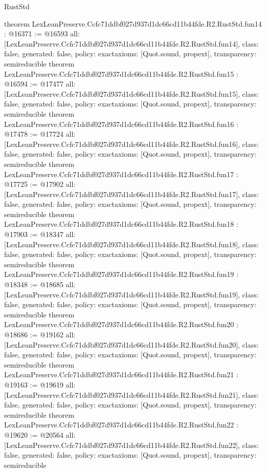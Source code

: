 \begin{lexlean}{RustStd}
\begin{coremodule}
{}
theorem LexLeanPreserve.Ccfc71ddbf027d937d1dc66cd11b44fde.R2.RustStd.fun14 : @16371 := @16593 {
  all: [LexLeanPreserve.Ccfc71ddbf027d937d1dc66cd11b44fde.R2.RustStd.fun14],
  class: false,
  generated: false,
  policy: exact{axioms: [Quot.sound, propext]},
  transparency: semireducible
}
theorem LexLeanPreserve.Ccfc71ddbf027d937d1dc66cd11b44fde.R2.RustStd.fun15 : @16594 := @17477 {
  all: [LexLeanPreserve.Ccfc71ddbf027d937d1dc66cd11b44fde.R2.RustStd.fun15],
  class: false,
  generated: false,
  policy: exact{axioms: [Quot.sound, propext]},
  transparency: semireducible
}
theorem LexLeanPreserve.Ccfc71ddbf027d937d1dc66cd11b44fde.R2.RustStd.fun16 : @17478 := @17724 {
  all: [LexLeanPreserve.Ccfc71ddbf027d937d1dc66cd11b44fde.R2.RustStd.fun16],
  class: false,
  generated: false,
  policy: exact{axioms: [Quot.sound, propext]},
  transparency: semireducible
}
theorem LexLeanPreserve.Ccfc71ddbf027d937d1dc66cd11b44fde.R2.RustStd.fun17 : @17725 := @17902 {
  all: [LexLeanPreserve.Ccfc71ddbf027d937d1dc66cd11b44fde.R2.RustStd.fun17],
  class: false,
  generated: false,
  policy: exact{axioms: [Quot.sound, propext]},
  transparency: semireducible
}
theorem LexLeanPreserve.Ccfc71ddbf027d937d1dc66cd11b44fde.R2.RustStd.fun18 : @17903 := @18347 {
  all: [LexLeanPreserve.Ccfc71ddbf027d937d1dc66cd11b44fde.R2.RustStd.fun18],
  class: false,
  generated: false,
  policy: exact{axioms: [Quot.sound, propext]},
  transparency: semireducible
}
theorem LexLeanPreserve.Ccfc71ddbf027d937d1dc66cd11b44fde.R2.RustStd.fun19 : @18348 := @18685 {
  all: [LexLeanPreserve.Ccfc71ddbf027d937d1dc66cd11b44fde.R2.RustStd.fun19],
  class: false,
  generated: false,
  policy: exact{axioms: [Quot.sound, propext]},
  transparency: semireducible
}
theorem LexLeanPreserve.Ccfc71ddbf027d937d1dc66cd11b44fde.R2.RustStd.fun20 : @18686 := @19162 {
  all: [LexLeanPreserve.Ccfc71ddbf027d937d1dc66cd11b44fde.R2.RustStd.fun20],
  class: false,
  generated: false,
  policy: exact{axioms: [Quot.sound, propext]},
  transparency: semireducible
}
theorem LexLeanPreserve.Ccfc71ddbf027d937d1dc66cd11b44fde.R2.RustStd.fun21 : @19163 := @19619 {
  all: [LexLeanPreserve.Ccfc71ddbf027d937d1dc66cd11b44fde.R2.RustStd.fun21],
  class: false,
  generated: false,
  policy: exact{axioms: [Quot.sound, propext]},
  transparency: semireducible
}
theorem LexLeanPreserve.Ccfc71ddbf027d937d1dc66cd11b44fde.R2.RustStd.fun22 : @19620 := @20564 {
  all: [LexLeanPreserve.Ccfc71ddbf027d937d1dc66cd11b44fde.R2.RustStd.fun22],
  class: false,
  generated: false,
  policy: exact{axioms: [Quot.sound, propext]},
  transparency: semireducible
}
\end{coremodule}
\end{lexlean}
